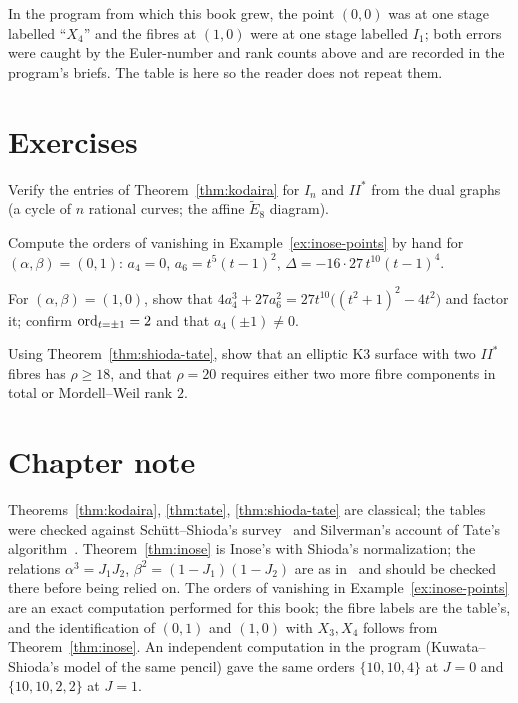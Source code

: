 \begin{remark}
In the program from which this book grew, the point $(0,0)$ was at one stage
labelled ``$X_4$'' and the fibres at $(1,0)$ were at one stage labelled
$I_1$; both errors were caught by the Euler-number and rank counts above and
are recorded in the program's briefs. The table is here so the reader does
not repeat them.
\end{remark}

\section{Exercises}

\begin{exercise}
Verify the entries of Theorem~\ref{thm:kodaira} for $I_n$ and $II^*$ from
the dual graphs (a cycle of $n$ rational curves; the affine $\tilde E_8$
diagram).
\end{exercise}

\begin{exercise}[$\star$]
Compute the orders of vanishing in Example~\ref{ex:inose-points} by hand for
$(\alpha,\beta)=(0,1)$: $a_4=0$, $a_6=t^5(t-1)^2$, $\Delta=-16\cdot27\,t^{10}(t-1)^4$.
\end{exercise}

\begin{exercise}
For $(\alpha,\beta)=(1,0)$, show that $4a_4^3+27a_6^2=27t^{10}\bigl((t^2+1)^2-4t^2\bigr)$
and factor it; confirm $\operatorname{ord}_{t=\pm1}=2$ and that $a_4(\pm1)\neq0$.
\end{exercise}

\begin{exercise}
Using Theorem~\ref{thm:shioda-tate}, show that an elliptic K3 surface with two
$II^*$ fibres has $\rho\ge18$, and that $\rho=20$ requires either two more
fibre components in total or Mordell--Weil rank $2$.
\end{exercise}

\section*{Chapter note}

Theorems~\ref{thm:kodaira}, \ref{thm:tate}, \ref{thm:shioda-tate} are
classical; the tables were checked against Sch\"utt--Shioda's
survey~\cite{SchuettShioda2010} and Silverman's account of Tate's
algorithm~\cite[IV.9]{Silverman1994}. Theorem~\ref{thm:inose} is Inose's with
Shioda's normalization; the relations $\alpha^3=J_1J_2$, $\beta^2=(1-J_1)(1-J_2)$
are as in~\cite{Shioda2006} and should be checked there before being relied
on. The orders of vanishing in Example~\ref{ex:inose-points} are an exact
computation performed for this book; the fibre labels are the table's, and the
identification of $(0,1)$ and $(1,0)$ with $X_3,X_4$ follows from
Theorem~\ref{thm:inose}. An independent computation in the program
(Kuwata--Shioda's model of the same pencil) gave the same orders
$\{10,10,4\}$ at $J=0$ and $\{10,10,2,2\}$ at $J=1$.
